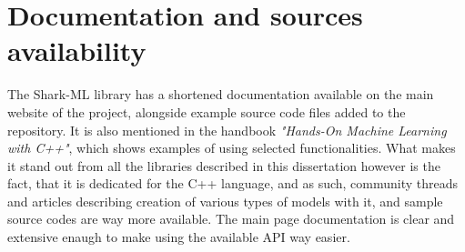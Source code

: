 
\section{Documentation and sources availability}

The Shark-ML library has a shortened documentation available on the main website of the project, alongside example source code files added to the repository. It is also mentioned in the handbook \textit{"Hands-On Machine Learning with C++"}\cite{handsOnMachineLearning}, which shows examples of using selected functionalities. What makes it stand out from all the libraries described in this dissertation however is the fact, that it is dedicated for the C++ language, and as such, community threads and articles describing creation of various types of models with it, and sample source codes are way more available. The main page documentation is clear and extensive enaugh to make using the available API way easier.